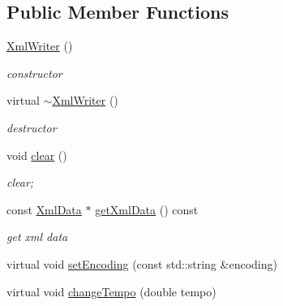 \subsection*{\-Public \-Member \-Functions}
\begin{DoxyCompactItemize}
\item 
\hypertarget{classsinsy_1_1XmlWriter_ae3462f88219ba977efe6bf4f671d6083}{\hyperlink{classsinsy_1_1XmlWriter_ae3462f88219ba977efe6bf4f671d6083}{\-Xml\-Writer} ()}\label{classsinsy_1_1XmlWriter_ae3462f88219ba977efe6bf4f671d6083}

\begin{DoxyCompactList}\small\item\em constructor \end{DoxyCompactList}\item 
\hypertarget{classsinsy_1_1XmlWriter_a5fad7b65b620dad44be1d3521cd4d4f9}{virtual \hyperlink{classsinsy_1_1XmlWriter_a5fad7b65b620dad44be1d3521cd4d4f9}{$\sim$\-Xml\-Writer} ()}\label{classsinsy_1_1XmlWriter_a5fad7b65b620dad44be1d3521cd4d4f9}

\begin{DoxyCompactList}\small\item\em destructor \end{DoxyCompactList}\item 
void \hyperlink{classsinsy_1_1XmlWriter_a20aeea8e8105ef55855816fe4ee87b03}{clear} ()
\begin{DoxyCompactList}\small\item\em clear; \end{DoxyCompactList}\item 
\hypertarget{classsinsy_1_1XmlWriter_a8d05b1d4963923228db8283cc1e0c9df}{const \hyperlink{classsinsy_1_1XmlData}{\-Xml\-Data} $\ast$ \hyperlink{classsinsy_1_1XmlWriter_a8d05b1d4963923228db8283cc1e0c9df}{get\-Xml\-Data} () const }\label{classsinsy_1_1XmlWriter_a8d05b1d4963923228db8283cc1e0c9df}

\begin{DoxyCompactList}\small\item\em get xml data \end{DoxyCompactList}\item 
virtual void \hyperlink{classsinsy_1_1XmlWriter_a65bf2c52e895553fa4f23f641c5c71e8}{set\-Encoding} (const std\-::string \&encoding)
\item 
\hypertarget{classsinsy_1_1XmlWriter_ab87f15d2f3345bc2edeae4db85651234}{virtual void \hyperlink{classsinsy_1_1XmlWriter_ab87f15d2f3345bc2edeae4db85651234}{change\-Tempo} (double tempo)}\label{classsinsy_1_1XmlWriter_ab87f15d2f3345bc2edeae4db85651234}


\end{DoxyCompactItemize}
